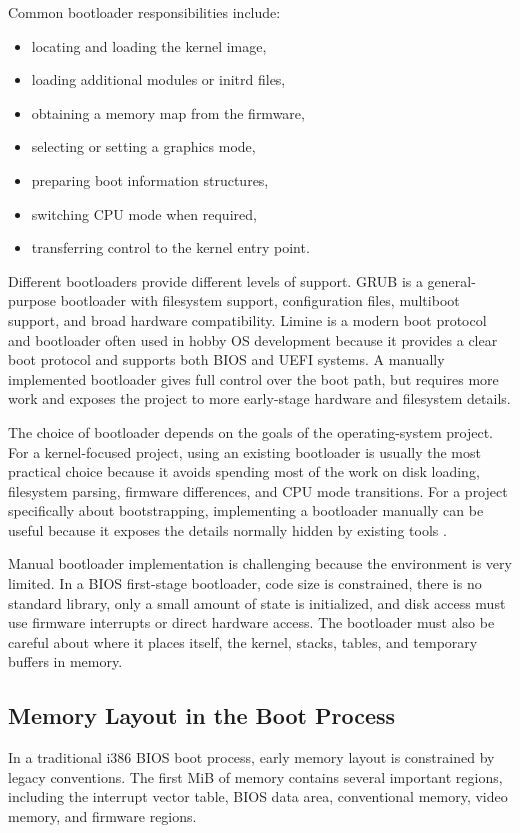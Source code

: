 Common bootloader responsibilities include:
\begin{itemize}
  \item locating and loading the kernel image,
  \item loading additional modules or initrd files,
  \item obtaining a memory map from the firmware,
  \item selecting or setting a graphics mode,
  \item preparing boot information structures,
  \item switching CPU mode when required,
  \item transferring control to the kernel entry point.
\end{itemize}

Different bootloaders provide different levels of support. GRUB is a general-purpose bootloader with filesystem support, configuration files, multiboot support, and broad hardware compatibility. Limine is a modern boot protocol and bootloader often used in hobby OS development because it provides a clear boot protocol and supports both BIOS and UEFI systems\cite{osdevBootSequence,limineProtocol, wikipediaLimine}. A manually implemented bootloader gives full control over the boot path, but requires more work and exposes the project to more early-stage hardware and filesystem details.

The choice of bootloader depends on the goals of the operating-system project. For a kernel-focused project, using an existing bootloader is usually the most practical choice because it avoids spending most of the work on disk loading, filesystem parsing, firmware differences, and CPU mode transitions. For a project specifically about bootstrapping, implementing a bootloader manually can be useful because it exposes the details normally hidden by existing tools \cite{osdevBootSequence}.

Manual bootloader implementation is challenging because the environment is very limited. In a BIOS first-stage bootloader, code size is constrained, there is no standard library, only a small amount of state is initialized, and disk access must use firmware interrupts or direct hardware access. The bootloader must also be careful about where it places itself, the kernel, stacks, tables, and temporary buffers in memory.

\subsection{Memory Layout in the Boot Process}
In a traditional i386 BIOS boot process, early memory layout is constrained by legacy conventions. The first MiB of memory contains several important regions, including the interrupt vector table, BIOS data area, conventional memory, video memory, and firmware regions\cite{osdevMemoryMapX86}.

